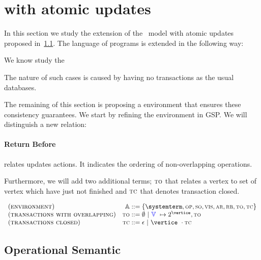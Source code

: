 
\section{{\gsp} with atomic updates}
\label{sec:transactions}

In this section we study the extension of the \gsp\ model with atomic updates proposed in~\ref{}. 
The language of programs is extended in the following way: 



We know study the 
 
The nature of such cases is caused by having no transactions as the usual databases.

The remaining of this section is proposing a environment that ensures these consistency guarantees. We start by refining the environment in GSP. We will distinguish a new relation:

\paragraph{Return Before} relates updates actions. It indicates the ordering of non-overlapping operations. 

Furthermore, we will add two additional terms; $\textsc{\scriptsize{TO}}$ that relates a vertex to set of vertex which have just not finished and $\textsc{\scriptsize{TC}}$ that denotes transaction closed.


\[
    \begin{array}{l@{\quad}r@{\;::=\;}l}
			 (\textsc{environment}) & \environmentterm &  \environmenttran{\systemterm}{\op}{\so}{\vis}{\arb}{\rb}{\tx}{\tc} \\
			 (\textsc{transactions with overlapping}) & \tx &  \emptyset  \ | \ \verticesets\ \mapsto 2^{\vertice},\tx   \\
			 (\textsc{transactions closed}) & \tc &  \epsilon  \ | \ \vertice\ \cdot \tc 
	   \end{array}
\]


\subsection{Operational Semantic}




